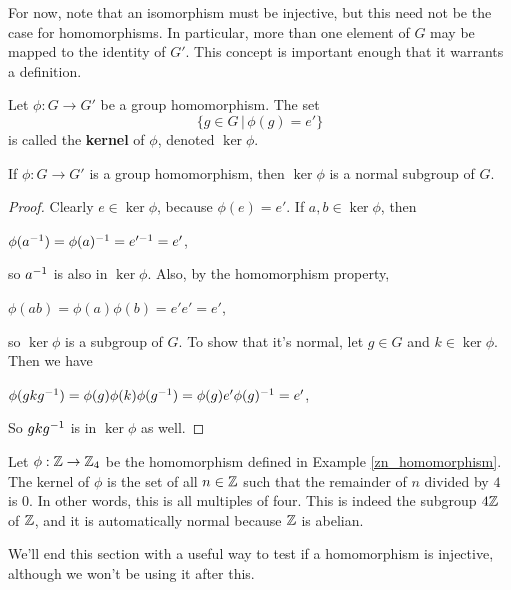 For now, note that an isomorphism must be injective, but this need not be the case for homomorphisms. In particular, more than one element of $G$ may be mapped to the identity of $G'$. This concept is important enough that it warrants a definition.

\begin{definition}
Let $\phi: G \to G'$ be a group homomorphism. The set
\begin{equation*}
    \{g \in G \,|\, \phi(g) = e'\}
\end{equation*}
is called the \textbf{kernel} of $\phi$, denoted $\ker \phi$.
\end{definition}

\begin{theorem}
\label{normalkernel}
If $\phi: G \to G'$ is a group homomorphism, then $\ker\phi$ is a normal subgroup of $G$.
\end{theorem}

\begin{proof}
Clearly $e \in \ker\phi$, because $\phi(e) = e'$. If $a, b \in \ker\phi$, then
\begin{center}
    $\phi(\inv a) = \inv{\phi(a)} = \inv{e'} = e'$,
\end{center}
so $\inv a$ is also in $\ker\phi$. Also, by the homomorphism property,
\begin{center}
    $\phi(ab) = \phi(a)\phi(b) = e'e' = e'$,
\end{center}
so $\ker\phi$ is a subgroup of $G$. To show that it's normal, let $g \in G$ and $k \in \ker\phi$. Then we have
\begin{center}
    $\phi(gk\inv g) = \phi(g)\phi(k)\phi(\inv g) = \phi(g) e' \inv{\phi(g)} = e'$,
\end{center}
So $gk\inv g$ is in $\ker\phi$ as well.

\end{proof}

\begin{example}
Let $\phi: \z \to \zn[4]$ be the homomorphism defined in Example \ref{zn_homomorphism}. The kernel of $\phi$ is the set of all $n \in \z$ such that the remainder of $n$ divided by $4$ is $0$. In other words, this is all multiples of four. This is indeed the subgroup $4\z$ of $\z$, and it is automatically normal because $\z$ is abelian.
\end{example}

We'll end this section with a useful way to test if a homomorphism is injective, although we won't be using it after this.

